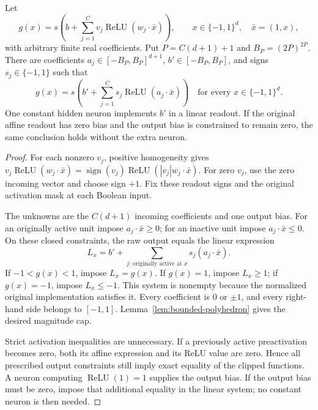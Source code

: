 \begin{lemma}
\label{lem:shallow-exact-compactification}
Let
\[
 g(x)=s\left(b+\sum_{j=1}^C v_j
                    \operatorname{ReLU}(w_j\cdot\bar x)\right),
 \qquad x\in\{-1,1\}^d,\quad\bar x=(1,x),
\]
with arbitrary finite real coefficients. Put $P=C(d+1)+1$ and $B_P=(2P)^{2P}$.
There are coefficients $a_j\in[-B_P,B_P]^{d+1}$, $b'\in[-B_P,B_P]$, and signs $s_j\in\{-1,1\}$ such that
\[
 g(x)=s\left(b'+\sum_{j=1}^C s_j
                   \operatorname{ReLU}(a_j\cdot\bar x)\right)
 \quad\text{for every }x\in\{-1,1\}^d.
\]
One constant hidden neuron implements $b'$ in a linear readout. If the original affine readout has zero bias and the output bias is constrained to remain zero, the same conclusion holds without the extra neuron.
\end{lemma}
\begin{proof}
For each nonzero $v_j$, positive homogeneity gives
$v_j\operatorname{ReLU}(w_j\cdot\bar x)
 =\operatorname{sign}(v_j)\operatorname{ReLU}(|v_j|w_j\cdot\bar x)$.
For zero $v_j$, use the zero incoming vector and choose sign $+1$. Fix these readout signs and the original activation mask at each Boolean input.

The unknowns are the $C(d+1)$ incoming coefficients and one output bias. For an originally active unit impose $a_j\cdot\bar x\ge0$; for an inactive unit impose $a_j\cdot\bar x\le0$. On these closed constraints, the raw output equals the linear expression
\[
 L_x=b'+\sum_{j:\,\text{originally active at }x}
                     s_j(a_j\cdot\bar x).
\]
If $-1<g(x)<1$, impose $L_x=g(x)$. If $g(x)=1$, impose $L_x\ge1$; if $g(x)=-1$, impose $L_x\le-1$. This system is nonempty because the normalized original implementation satisfies it. Every coefficient is $0$ or $\pm1$, and every right-hand side belongs to $[-1,1]$. Lemma~\ref{lem:bounded-polyhedron} gives the desired magnitude cap.

Strict activation inequalities are unnecessary. If a previously active preactivation becomes zero, both its affine expression and its ReLU value are zero. Hence all prescribed output constraints still imply exact equality of the clipped functions. A neuron computing $\operatorname{ReLU}(1)=1$ supplies the output bias. If the output bias must be zero, impose that additional equality in the linear system; no constant neuron is then needed.
\end{proof}

